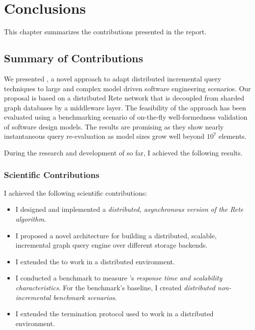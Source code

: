 \chapter{Conclusions}
\label{chap:conclusions}

This chapter summarizes the contributions presented in the report. 

\section{Summary of Contributions}

We presented \iqd{}, a novel approach to adapt distributed incremental query techniques to large and complex model driven software engineering scenarios. Our proposal is based on a distributed Rete network that is decoupled from sharded graph databases by a middleware layer. The feasibility of the approach has been evaluated using a benchmarking scenario of on-the-fly well-formedness validation of software design models. The results are promising as they show nearly instantaneous query re-evaluation as model sizes grow well beyond $10^7$ elements.

During the research and development of \iqd{} so far, I achieved the following results.

\subsection{Scientific Contributions}

I achieved the following scientific contributions:

\begin{itemize}
  \item I designed and implemented a \emph{distributed, asynchronous version of the Rete algorithm}. 
  \item I proposed a novel architecture for building a distributed, scalable, incremental graph query engine over different storage backends. %
  \item I extended the \tb{} to work in a distributed environment.  
  \item I conducted a benchmark to measure \iqd{}'s \emph{response time and scalability characteristics}. For the benchmark's baseline, I created \emph{distributed non-incremental benchmark scenarios}. 
  \item I extended the termination protocol used \eiq{} to work in a distributed environment. 
\end{itemize}

